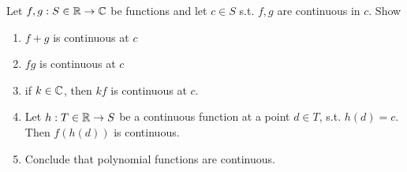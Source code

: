 \begin{example}
  Let $f,g:S\in\mathbb R\to\mathbb C$ be functions and let $c\in S$ s.t. $f,g$ are continuous in $c$.
  Show
  \begin{enumerate}
    \item $f+g$ is continuous at $c$
    \item $fg$ is continuous at $c$
    \item if $k\in\mathbb C$, then $kf$ is continuous at $c$.
    \item Let $h:T\in\mathbb R\to S$ be a continuous function at a point $d\in T$, s.t.
      $h(d)=c$. Then $f(h(d))$ is continuous.
    \item Conclude that polynomial functions are continuous.
  \end{enumerate}
  \label{ex:trivialCont}
\end{example}
